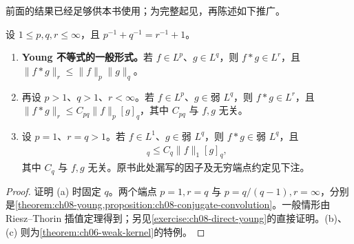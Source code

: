 \documentclass[../../main.tex]{subfiles}
\begin{document}
前面的结果已经足够供本书使用；为完整起见，再陈述如下推广。
\begin{proposition}\label{proposition:ch08-general-young}
设 $1\leqslant p,q,r\leqslant\infty$，且 $p^{-1}+q^{-1}=r^{-1}+1$。
\begin{enumerate}
\item\label{item:ch08-general-young-strong}\textbf{Young 不等式的一般形式。}若 $f\in L^p$、$g\in L^q$，则 $f*g\in L^r$，且 $\|f*g\|_r\leqslant\|f\|_p\|g\|_q$。
\item\label{item:ch08-general-young-weak-strong}再设 $p>1$、$q>1$、$r<\infty$。若 $f\in L^p$、$g\in\text{弱 }L^q$，则 $f*g\in L^r$，且 $\|f*g\|_r\leqslant C_{pq}\|f\|_p[g]_q$，其中 $C_{pq}$ 与 $f,g$ 无关。
\item\label{item:ch08-general-young-weak}设 $p=1$、$r=q>1$。若 $f\in L^1$、$g\in\text{弱 }L^q$，则 $f*g\in\text{弱 }L^q$，且
\begin{align*}
[f*g]_q\leqslant C_q\|f\|_1[g]_q,
\end{align*}
其中 $C_q$ 与 $f,g$ 无关。原书此处漏写的因子及无穷端点约定见下注。
\end{enumerate}
\end{proposition}
\begin{proof}
证明 (a) 时固定 $q$。两个端点 $p=1,r=q$ 与 $p=q/(q-1),r=\infty$，分别是\cref{theorem:ch08-young,proposition:ch08-conjugate-convolution}。一般情形由 Riesz--Thorin 插值定理得到；另见\cref{exercise:ch08-direct-young}的直接证明。(b)、(c) 则为\cref{theorem:ch06-weak-kernel}的特例。
\end{proof}
\end{document}
